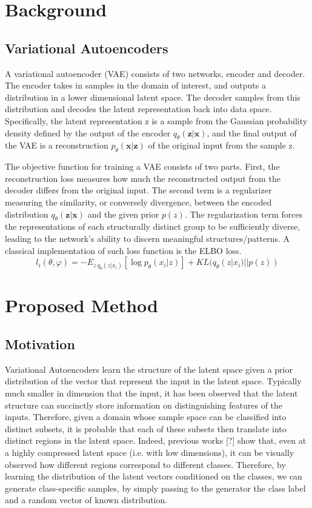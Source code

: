 \documentclass{article}
\begin{document}
\section{Background}
\subsection{Variational Autoencoders}

A variational autoencoder (VAE) consists of two networks, encoder and decoder. The encoder
takes in samples in the domain of interest, and outputs a distribution in a lower dimensional
latent space. The decoder samples from this distribution and decodes the latent representation
back into data space. Specifically, the latent representation z is a sample from the Gaussian
probability density defined by the output of the encoder $q_\theta(\mathbf{z}|\mathbf{x})$, and
the final output of the VAE is a reconstruction $p_\theta(\mathbf{x}|\mathbf{z})$ of the original input 
from the sample z. \par
The objective function for training a VAE consists of two parts. First, the reconstruction loss measures how much the reconstructed output from the decoder differs from the original input. The second term is a regularizer measuring the similarity, or conversely divergence, between the encoded distribution $q_\theta(\mathbf{z}|\mathbf{x})$ and the given prior $p(z)$. The regularization term forces the representations of each structurally distinct group to be sufficiently diverse, leading to the network's ability to discern meaningful structures/patterns. A classical implementation of such loss function is the ELBO loss.
\begin{equation} 
l_i(\theta, \varphi) = - E_{z~q_\theta(z|x_i)} [\log{p_\theta(x_i|z)}]+KL(q_\theta(z|x_i)||p(z))
\end{equation}

\section{Proposed Method}
\subsection{Motivation}

Variational Autoencoders learn the structure of the latent space given a prior distribution of the vector that represent the input in the latent space. Typically much smaller in dimension that the input, it has been observed that the latent structure can succinctly store information on distinguishing features of the inputs. Therefore, given a domain whose sample space can be classified into distinct subsets, it is probable that each of these subsets then translate into distinct regions in the latent space. Indeed, previous works [?] show that, even at a highly compressed latent space (i.e. with low dimensions), it can be visually observed how different regions correspond to different classes.
Therefore, by learning the distribution of the latent vectors conditioned on the classes, we can generate class-specific samples, by simply passing to the generator the class label and a random vector of known distribution.
\end{document}
